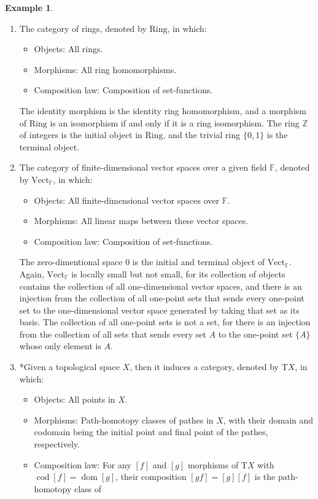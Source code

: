 \documentclass{article}
\theoremstyle{definition}
\theoremstyle{definition}
\newtheorem{example}{Example}[section]
\theoremstyle{remark}
\DeclareMathOperator{\dom}{dom}
\DeclareMathOperator{\cod}{cod}
\begin{document}
\begin{example}
\begin{enumerate}[label=(\roman*)]
	\item The category of rings, denoted by $\mathrm{Ring}$, in which:
		\begin{itemize}
			\item Objects: All rings.
			\item Morphisms: All ring homomorphisms.
			\item Composition law: Composition of set-functions.
		\end{itemize}
	The identity morphism is the identity ring homomorphism, and a morphism of $\mathrm{Ring}$ is an isomorphism if and only if it is a ring isomorphism. The ring $\mathbb{Z}$ of integers is the initial object in $\mathrm{Ring}$, and the trivial ring $\{0,1\}$ is the terminal object.
	\item The category of finite-dimensional vector spaces over a given field $\mathbb{F}$, denoted by $\mathrm{Vect}_\mathbb{F}$, in which:
		\begin{itemize}
			\item Objects: All finite-dimensional vector spaces over $\mathbb{F}$.
			\item Morphisms: All linear maps between these vector spaces.
			\item Composition law: Composition of set-functions.
		\end{itemize}
	The zero-dimentional space $0$ is the initial and terminal object of $\mathrm{Vect}_\mathbb{F}$. Again, $\mathrm{Vect}_\mathbb{F}$ is locally small but not small, for its collection of objects contains the collection of all one-dimensional vector spaces, and there is an injection from the collection of all one-point sets that sends every one-point set to the one-dimensional vector space generated by taking that set as its basis. The collection of all one-point sets is not a set, for there is an injection from the collection of all sets that sends every set $A$ to the one-point set $\{A\}$ whose only element is $A$.
	\item *Given a topological space $X$, then it induces a category, denoted by $\mathrm{T}X$, in which:
		\begin{itemize}
			\item Objects: All points in $X$.
			\item Morphisms: Path-homotopy classes of pathes in $X$, with their domain and codomain being the initial point and final point of the pathes, respectively.
			\item Composition law: For any $[f]$ and $[g]$ morphisms of $\mathrm{T}X$ with $\cod[f]=\dom [g]$, their composition $[gf]=[g][f]$ is the path-homotopy class of

\end{itemize}
\end{enumerate}
\end{example}
\end{document}
